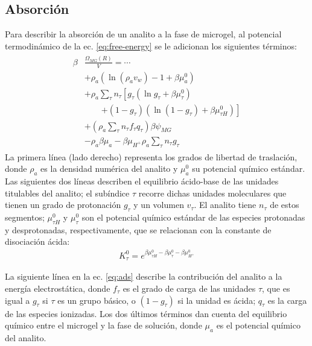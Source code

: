 \subsection{Absorci\'on}


Para describir la absorci\'on de un analito a la fase de microgel,
al potencial termodin\'amico de la ec. \ref{eq:free-energy} se le adicionan los siguientes t\'erminos:
%
%
%
\begin{align}
\begin{aligned}
\beta&\frac{\Omega_{MG}(R)}{V}= \cdots\\&+ \rho_a\left(\ln\left(\rho_a v_w\right) -1 + \beta\mu^0_a\right) \\
& + \rho_a \sum_\tau n_\tau  \left[g_\tau(\ln g_\tau+ \beta\mu^0_{\tau})\right.\\
&\qquad\left.+(1-g_\tau)(\ln (1-g_\tau)+\beta\mu^0_{\tau H})\right] \\
& +  \left( \rho_a \sum_\tau n_\tau f_\tau q_\tau\right)\beta\psi_{MG}\\
& -\rho_a\beta\mu_a
 -\beta\mu_{H^+} \rho_a \sum_\tau n_\tau g_\tau
\end{aligned}
\label{eq:ads}
\end{align}
%
\noindent La primera l\'inea (lado derecho) representa los grados de libertad de traslaci\'on,
donde $\rho_a$ es la densidad num\'erica del analito y $\mu_a^0$ su potencial qu\'imico est\'andar.
Las siguientes dos l\'ineas describen el equilibrio \'acido-base de las unidades titulables del analito;
el sub\'indice $\tau$ recorre dichas unidades moleculares que tienen un grado de protonaci\'on $g_\tau$ y un volumen $v_\tau$.
El analito tiene $n_\tau$ de estos segmentos;
$\mu^0_{\tau H}$ y $\mu^0_\tau$ son el potencial qu\'imico est\'andar de las especies protonadas y desprotonadas, respectivamente, que se relacionan con la constante de disociaci\'on \'acida:
%
\begin{align}
K^0_{\tau}= e^{\beta\mu^0_{\tau H}-\beta\mu^0_{\tau}-\beta\mu^0_{H^+}}
\end{align}
%

La siguiente l\'inea en la ec. \ref{eq:ads} describe la contribuci\'on del analito a la energ\'ia electrost\'atica, donde $f_\tau$ es el grado de carga de las unidades $\tau$, que es igual a $g_\tau$ si $\tau$ es un grupo b\'asico, o $(1-g_\tau)$ si la unidad es \'acida; $q_\tau$ es la carga de las especies ionizadas.
Los dos \'ultimos t\'erminos dan cuenta del equilibrio qu\'imico entre el microgel y la fase de soluci\'on, donde $\mu_a$ es el potencial qu\'imico del analito.

